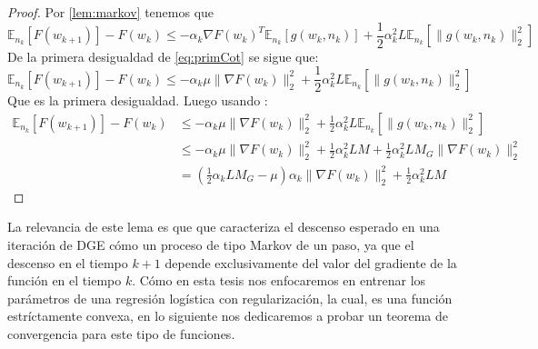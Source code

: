 \documentclass{book}
\theoremstyle{plain}
\theoremstyle{definition}
\theoremstyle{remark}
\begin{document}
\begin{proof}
Por \ref{lem:markov} tenemos que 
\begin{equation*}
      \mathbb{E}_{n_k}[F(w_{k+1})] - F(w_{k}) \leq -\alpha_k\nabla F(w_{k})^T\mathbb{E}_{n_k}[g(w_{k}, n_{k})]+\frac{1}{2}\alpha^2_kL\mathbb{E}_{n_k}[\|g(w_{k}, n_{k})\|_2^2]
\end{equation*}
De la primera desigualdad de \ref{eq:primCot} se sigue que:
\begin{equation*}
      \mathbb{E}_{n_k}[F(w_{k+1})] - F(w_{k}) \leq -\alpha_k\mu\|\nabla F(w_k)\|_2^2 +\frac{1}{2}\alpha^2_kL\mathbb{E}_{n_k}[\|g(w_{k}, n_{k})\|_2^2]
\end{equation*}
Que es la primera desigualdad. Luego usando \label{eq:secCot1}: 
\begin{equation*}
    \begin{split}
      \mathbb{E}_{n_k}[F(w_{k+1})] - F(w_{k}) & \leq -\alpha_k\mu\|\nabla F(w_k)\|_2^2 +\frac{1}{2}\alpha^2_kL\mathbb{E}_{n_k}[\|g(w_{k}, n_{k})\|_2^2]\\
      & \leq  -\alpha_k\mu\|\nabla F(w_k)\|_2^2 + \frac{1}{2}\alpha^2_kLM + \frac{1}{2}\alpha^2_kLM_G\|\nabla F(w_k)\|_2^2\\
      & = (\frac{1}{2}\alpha_kLM_G-\mu)\alpha_k\|\nabla F(w_k)\|_2^2 + \frac{1}{2}\alpha^2_kLM 
     \end{split}
\end{equation*}
\end{proof}

La relevancia de este lema es que que caracteriza el descenso esperado en una iteración de DGE cómo un proceso de tipo Markov de un paso, ya que el descenso en el tiempo $k+1$ depende exclusivamente del valor del gradiente de la función en el tiempo $k$. Cómo en esta tesis nos enfocaremos en entrenar los parámetros de una regresión logística con regularización, la cual, es una función estríctamente convexa, en lo siguiente nos dedicaremos a probar un teorema de convergencia para este tipo de funciones. 
\end{document}
